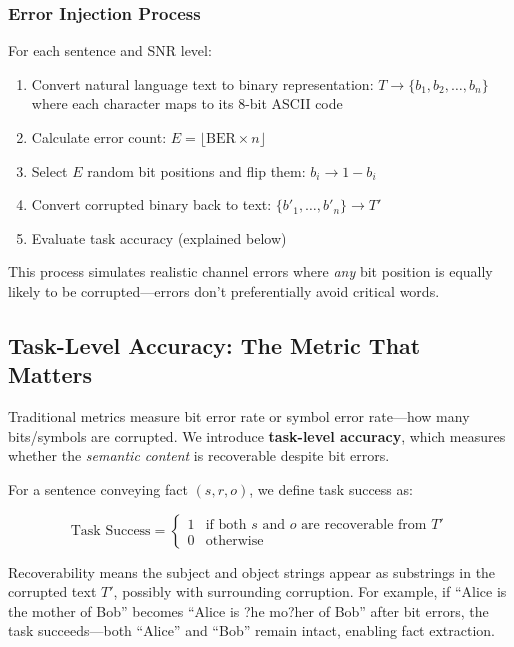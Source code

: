 \documentclass[conference]{IEEEtran}
\begin{document}
\subsubsection{Error Injection Process}

For each sentence and SNR level:

\begin{enumerate}
\item Convert natural language text to binary representation: $T \rightarrow \{b_1, b_2, \ldots, b_n\}$ 
      where each character maps to its 8-bit ASCII code
\item Calculate error count: $E = \lfloor \text{BER} \times n \rfloor$
\item Select $E$ random bit positions and flip them: $b_i \rightarrow 1 - b_i$
\item Convert corrupted binary back to text: $\{b'_1, \ldots, b'_n\} \rightarrow T'$
\item Evaluate task accuracy (explained below)
\end{enumerate}

This process simulates realistic channel errors where \textit{any} bit 
position is equally likely to be corrupted—errors don't preferentially 
avoid critical words.

\subsection{Task-Level Accuracy: The Metric That Matters}

Traditional metrics measure bit error rate or symbol error rate—how 
many bits/symbols are corrupted. We introduce \textbf{task-level accuracy}, 
which measures whether the \textit{semantic content} is recoverable 
despite bit errors.

For a sentence conveying fact $(s, r, o)$, we define task success as:

\begin{equation}
\text{Task Success} = \begin{cases}
1 & \text{if both } s \text{ and } o \text{ are recoverable from } T' \\
0 & \text{otherwise}
\end{cases}
\end{equation}

Recoverability means the subject and object strings appear as substrings 
in the corrupted text $T'$, possibly with surrounding corruption. For 
example, if ``Alice is the mother of Bob'' becomes ``Alice is ?he mo?her of Bob'' 
after bit errors, the task succeeds—both ``Alice'' and ``Bob'' remain 
intact, enabling fact extraction.
\end{document}
